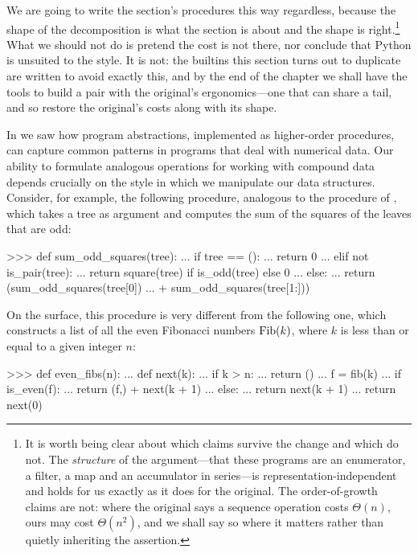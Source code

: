 \begin{notTaste}
We are going to write the section's procedures this way regardless, because the
shape of the decomposition is what the section is about and the shape is
right.\footnote{It is worth being clear about which claims survive the change
and which do not.  The \emph{structure} of the argument---that these programs
are an enumerator, a filter, a map and an accumulator in series---is
representation-independent and holds for us exactly as it does for the
original.  The order-of-growth claims are not: where the original says a
sequence operation costs \( \Theta(n) \), ours may cost \( \Theta(n^2) \), and
we shall say so where it matters rather than quietly inheriting the assertion.}
What we should not do is pretend the cost is not there, nor conclude that
Python is unsuited to the style.  It is not: the builtins this section turns
out to duplicate are written to avoid exactly this, and by the end of the
chapter we shall have the tools to build a pair with the original's
ergonomics---one that can share a tail, and so restore the original's costs
along with its shape.
\end{notTaste}

In  we saw how program abstractions, implemented as
higher-order procedures, can capture common patterns in programs that deal with
numerical data.  Our ability to formulate analogous operations for working with
compound data depends crucially on the style in which we manipulate our data
structures.  Consider, for example, the following procedure, analogous to the
 procedure of , which takes a tree as
argument and computes the sum of the squares of the leaves that are odd:

\begin{codeBlock}
>>> def sum_odd_squares(tree):
...     if tree == ():
...         return 0
...     elif not is_pair(tree):
...         return square(tree) if is_odd(tree) else 0
...     else:
...         return (sum_odd_squares(tree[0])
...                 + sum_odd_squares(tree[1:]))
\end{codeBlock}

\noindent
On the surface, this procedure is very different from the following one, which
constructs a list of all the even Fibonacci numbers \( {\rm Fib}(k) \), where
\( k \) is less than or equal to a given integer \( n \):

\begin{codeBlock}
>>> def even_fibs(n):
...     def next(k):
...         if k > n:
...             return ()
...         f = fib(k)
...         if is_even(f):
...             return (f,) + next(k + 1)
...         else:
...             return next(k + 1)
...     return next(0)
\end{codeBlock}


